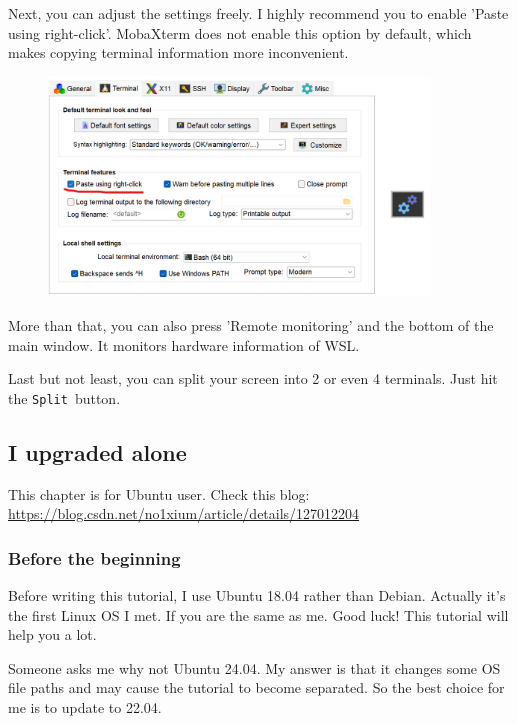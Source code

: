 \documentclass[12pt]{ctexart}
\newenvironment{mdquote}
{%
  \par\noindent
  \begin{list}{}{%
      \setlength{\leftmargin}{1em}%
      \setlength{\rightmargin}{0pt}%
      \setlength{\itemindent}{0pt}%
      \setlength{\listparindent}{\parindent}%
      \setlength{\topsep}{0.5\baselineskip}%
  }
  \item[\textbf{>}\ ]\itshape
}
{\end{list}\par}
\begin{document}
Next, you can adjust the settings freely. I highly recommend you to
enable 'Paste using right-click'.
MobaXterm does not enable this option by default, which makes copying
terminal information more inconvenient.

\begin{figure}[H]
    \centering
    \includegraphics[width=0.9\textwidth,keepaspectratio]{assets/Linux/2.2 MobaXterm, go ssh it!/5.png}
\end{figure}

More than that, you can also press 'Remote
monitoring' and the bottom of the main window. It
monitors hardware information of WSL.

Last but not least, you can split your screen into 2 or even 4
terminals. Just hit the \texttt{Split}\ button.

\newpage
\subsection{\textbf{I upgraded alone}}

\begin{mdquote}
This chapter is for Ubuntu user. Check this blog:
\url{https://blog.csdn.net/no1xium/article/details/127012204}
\end{mdquote}

\subsubsection{\textbf{Before the beginning}}

Before writing this tutorial, I use Ubuntu 18.04 rather than Debian.
Actually it's the first Linux OS I met. If you are the
same as me. Good luck! This tutorial will help you a lot.

Someone asks me why not Ubuntu 24.04. My answer is that it changes some
OS file paths and may cause the tutorial to become separated. So the
best choice for me is to update to 22.04.
\end{document}
